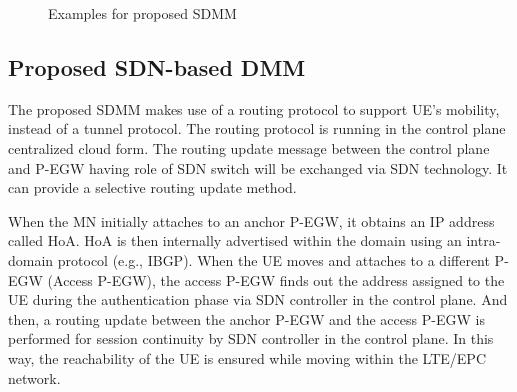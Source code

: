 \documentclass[runningheads,a4paper]{llncs}
\begin{document}
\begin{figure}[t] 
\centering 
{}
\caption{Examples for proposed SDMM}
\label{fig:2}
\end{figure}

\subsection{Proposed SDN-based DMM}

The proposed SDMM makes use of a routing protocol to support UE's mobility, instead of a tunnel protocol. The routing protocol is running in the control plane centralized cloud form. The routing update message between the control plane and P-EGW having role of SDN switch will be exchanged via SDN technology. It can provide a selective routing update method.

When the MN initially attaches to an anchor P-EGW, it obtains an IP address called HoA. HoA is then internally advertised within the domain using an intra-domain protocol (e.g., IBGP). When the UE moves and attaches to a different P-EGW (Access P-EGW), the access P-EGW finds out the address assigned to the UE during the authentication phase via SDN controller in the control plane. And then, a routing update between the anchor P-EGW and the access P-EGW is performed for session continuity by SDN controller in the control plane. In this way, the reachability of the UE is ensured while moving within the LTE/EPC network.
\end{document}
